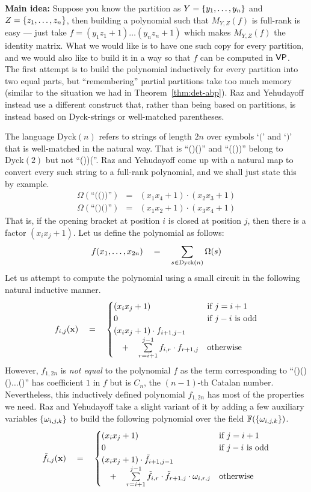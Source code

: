 {\bf Main idea:} Suppose you know the partition as $Y = \left\{y_1,\dots, y_n\right\}$ and $Z = \left\{z_1,\dots, z_n\right\}$, then building a polynomial such that $M_{Y,Z}(f)$ is full-rank is easy --- just take $f = (y_1z_1 + 1)\dots (y_n z_n + 1)$ which makes $M_{Y,Z}(f)$ the identity matrix. What we would like is to have one such copy for every partition, and we would also like to build it in a way so that $f$ can be computed in $\mathsf{VP}$. \\

The first attempt is to build the polynomial inductively for every partition into two equal parts, but ``remembering'' partial partitions take too much memory (similar to the situation we had in Theorem~\ref{thm:det-abp}). Raz and Yehudayoff instead use a different construct that, rather than being based on partitions, is instead based on Dyck-strings or well-matched parentheses. 

The language $\mathrm{Dyck}(n)$ refers to strings of length $2n$ over symbols `$($' and `$)$' that is well-matched in the natural way. That is ``()()'' and ``(())'' belong to $\mathrm{Dyck}(2)$ but not ``())(''. Raz and Yehudayoff come up with a natural map to convert every such string to a full-rank polynomial, and we shall just state this by example. 
\begin{eqnarray*}
\Omega(\text{``(())''}) & = & (x_1x_4 + 1)\cdot (x_2x_3 + 1)\\
\Omega(\text{``()()''}) & = & (x_1x_2 + 1)\cdot (x_3x_4 + 1)
\end{eqnarray*}
That is, if the opening bracket at position $i$ is closed at position $j$, then there is a factor $(x_ix_j + 1)$. Let us define the polynomial as follows:
\[
f(x_1,\dots, x_{2n}) \quad = \quad \sum_{s\in \mathrm{Dyck}(n)} \Omega(s) 
\]
Let us attempt to compute the polynomial using a small circuit in the following natural inductive manner. 
\[
f_{i,j}(\mathbf{x}) \quad = \quad \begin{cases}
(x_ix_j+1) & \text{if $j = i+1$}\\
0 & \text{if $j-i$ is odd}\\
(x_ix_j+1) \cdot f_{i+1,j-1} &\\
 \quad + \quad \sum\limits_{r=i+1}^{j-1} f_{i,r}\cdot f_{r+1,j} & \text{otherwise}
\end{cases}
\]
However, $f_{1,2n}$ is \emph{not equal} to the polynomial $f$ as the term corresponding to ``()()()$\dots$()'' has coefficient $1$ in $f$ but is $C_n$, the $(n-1)$-th Catalan number. Nevertheless, this inductively defined polynomial $f_{1,2n}$ has most of the properties we need. Raz and Yehudayoff take a slight variant of it by adding a few auxiliary variables $\left\{\omega_{i,j,k}\right\}$ to build the following polynomial over the field $\mathbb{F}(\left\{\omega_{i,j,k}\right\})$. 
\[
\tilde{f}_{i,j}(\mathbf{x}) \quad = \quad \begin{cases}
(x_ix_j+1) & \text{if $j = i+1$}\\
0 & \text{if $j-i$ is odd}\\
(x_ix_j+1) \cdot \tilde{f}_{i+1,j-1} &\\
 \quad + \quad \sum\limits_{r=i+1}^{j-1} \tilde{f}_{i,r}\cdot \tilde{f}_{r+1,j} \cdot \omega_{i,r,j} & \text{otherwise}
\end{cases}
\]

